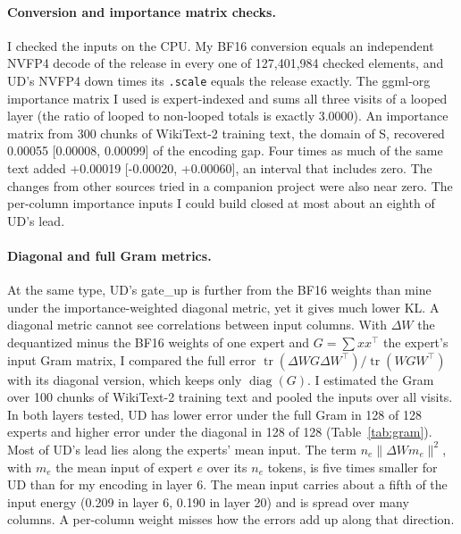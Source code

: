 \documentclass[11pt,a4paper]{article}
\newcommand{\code}[1]{\texttt{#1}}
\begin{document}
\paragraph{Conversion and importance matrix checks.} I checked the inputs on the CPU. My BF16 conversion equals an independent NVFP4 decode of the release in every one of 127,401,984 checked elements, and UD's NVFP4 down times its \code{.scale} equals the release exactly. The ggml-org importance matrix I used is expert-indexed and sums all three visits of a looped layer (the ratio of looped to non-looped totals is exactly 3.0000). An importance matrix from 300 chunks of WikiText-2 training text, the domain of S, recovered 0.00055 [0.00008, 0.00099] of the encoding gap. Four times as much of the same text added +0.00019 [-0.00020, +0.00060], an interval that includes zero. The changes from other sources tried in a companion project were also near zero. The per-column importance inputs I could build closed at most about an eighth of UD's lead.

\paragraph{Diagonal and full Gram metrics.} At the same type, UD's gate\_up is further from the BF16 weights than mine under the importance-weighted diagonal metric, yet it gives much lower KL. A diagonal metric cannot see correlations between input columns. With $\Delta W$ the dequantized minus the BF16 weights of one expert and $G = \sum x x^\top$ the expert's input Gram matrix, I compared the full error $\operatorname{tr}(\Delta W G \Delta W^\top) / \operatorname{tr}(W G W^\top)$ with its diagonal version, which keeps only $\operatorname{diag}(G)$. I estimated the Gram over 100 chunks of WikiText-2 training text and pooled the inputs over all visits. In both layers tested, UD has lower error under the full Gram in 128 of 128 experts and higher error under the diagonal in 128 of 128 (Table~\ref{tab:gram}). Most of UD's lead lies along the experts' mean input. The term $n_e \lVert \Delta W m_e \rVert^2$, with $m_e$ the mean input of expert $e$ over its $n_e$ tokens, is five times smaller for UD than for my encoding in layer 6. The mean input carries about a fifth of the input energy (0.209 in layer 6, 0.190 in layer 20) and is spread over many columns. A per-column weight misses how the errors add up along that direction.
\end{document}
